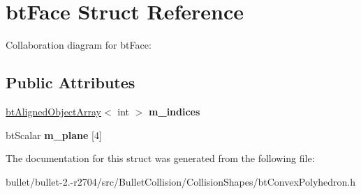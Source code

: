 \hypertarget{structbt_face}{\section{bt\+Face Struct Reference}
\label{structbt_face}
}


Collaboration diagram for bt\+Face\+:
\subsection*{Public Attributes}
\begin{DoxyCompactItemize}
\item 
\hypertarget{structbt_face_a7b1a9a4dec446fe30ef77e1e163f3e2f}{\hyperlink{classbt_aligned_object_array}{bt\+Aligned\+Object\+Array}$<$ int $>$ {\bfseries m\+\_\+indices}}\label{structbt_face_a7b1a9a4dec446fe30ef77e1e163f3e2f}

\item 
\hypertarget{structbt_face_ad85053ab70fa7f8fcaba71b50ff0b5c4}{bt\+Scalar {\bfseries m\+\_\+plane} \mbox{[}4\mbox{]}}\label{structbt_face_ad85053ab70fa7f8fcaba71b50ff0b5c4}

\end{DoxyCompactItemize}


The documentation for this struct was generated from the following file\+:\begin{DoxyCompactItemize}
\item 
bullet/bullet-\/2.-\/r2704/src/\+Bullet\+Collision/\+Collision\+Shapes/bt\+Convex\+Polyhedron.\+h\end{DoxyCompactItemize}

